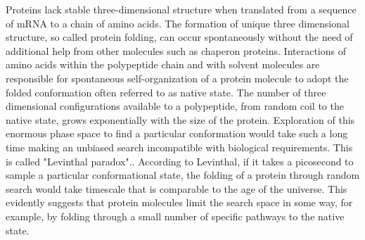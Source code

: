 \documentclass[../talant.diss.submit.tex]{subfiles}
\begin{document}
Proteins lack stable three-dimensional structure when translated from a sequence
of mRNA to a chain of amino acids. The formation of unique three dimensional
structure, so called protein folding, can occur spontaneously without the need
of additional help from other molecules such as chaperon proteins.  Interactions
of amino acids within the polypeptide chain and with solvent molecules are
responsible for spontaneous self-organization of a protein molecule to adopt the
folded conformation often referred to as native state.
The number of three dimensional configurations available to a polypeptide, from
random coil to the native state, grows exponentially with the size of the
protein.  Exploration of this enormous phase space to find a particular
conformation would take such a long time making an unbiased search incompatible
with biological requirements.  This is called "Levinthal
paradox".\cite{levinthal:68t}.  According to Levinthal, if it takes a picosecond
to sample a particular conformational state, the folding of a protein through
random search would take timescale that is comparable to the age of the
universe.  This evidently suggests that protein molecules limit the search space
in some way, for example, by folding through a small number of specific pathways
to the native state.
\end{document}
